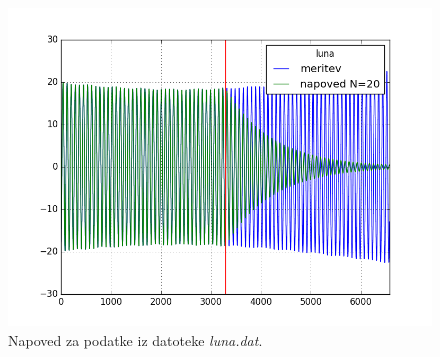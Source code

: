 \documentclass[slovene,11pt,a4paper]{article}
\numberwithin{equation}{section} %
\numberwithin{figure}{section} %
\numberwithin{table}{section} %
\begin{document}
\begin{figure}[!t]
\centering
\includegraphics[scale=0.5]{slike/napoved_luna.png}
\caption{Napoved za podatke iz datoteke \textsl{luna.dat}.}
\end{figure}
\end{document}
